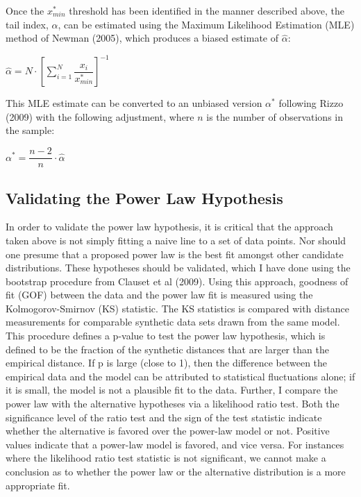 \documentclass[11pt,a4paper,oldfontcommands]{memoir}
\begin{document}
{Once the $x_{min}^\ast$ threshold has been identified in the manner described above, the tail index, $\alpha$, can be estimated using the Maximum Likelihood Estimation (MLE) method of Newman (2005), which produces a biased estimate of $\hat{\alpha}$:

\begin{center}
$\hat{\alpha}= N\cdot [\sum_{i=1}^{N} \dfrac{x_i}{x_{min}^\ast}]^{-1}$
\end{center}

\begin{flushleft}

This MLE estimate can be converted to an unbiased version $\alpha^{\ast}$ following Rizzo (2009) with the following adjustment, where $n$ is the number of observations in the sample: 
\end{flushleft}

\begin{center}
$\alpha^{\ast}= \dfrac{{n-2}}{n}\cdot\hat{\alpha}$
\end{center}

\subsection{Validating the Power Law Hypothesis}

In order to validate the power law hypothesis, it is critical that the approach taken above is not simply fitting a naive line to a set of data points. Nor should one presume that a proposed power law is the best fit amongst other candidate distributions. These hypotheses should be validated, which I have done using the bootstrap procedure from Clauset et al (2009). Using this approach, goodness of fit (GOF) between the data and the power law fit is measured using the Kolmogorov-Smirnov (KS) statistic. The KS statistics is compared with distance measurements for comparable synthetic data sets drawn from the same model. This procedure defines a p-value to test the power law hypothesis, which is defined to be the fraction of the synthetic distances that are larger than the empirical distance. If p is large (close to 1), then the difference between the empirical data and the model can be attributed to statistical fluctuations alone; if it is small, the model is not a plausible fit to the data. Further, I compare the power law with the alternative hypotheses via a likelihood ratio test. Both the significance level of the ratio test and the sign of the test statistic indicate whether the alternative is favored over the power-law model or not. Positive values indicate that a power-law model is favored, and vice versa. For instances where the likelihood ratio test statistic is not significant, we cannot make a conclusion as to whether the power law or the alternative distribution is a more appropriate fit. 


}
\end{document}
